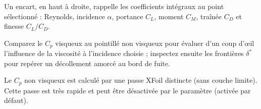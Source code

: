 Un encart, en haut à droite, rappelle les coefficients intégraux au
point sélectionné : Reynolds, incidence $\alpha$, portance $C_L$,
moment $C_M$, traînée $C_D$ et finesse $C_L/C_D$.

\begin{astuce}
Comparez le $C_p$ visqueux au pointillé non visqueux pour évaluer
d'un coup d'œil l'influence de la viscosité à l'incidence choisie ;
inspectez ensuite les frontières $\delta^*$ pour repérer un
décollement amorcé au bord de fuite.
\end{astuce}

\begin{noteinfo}
Le $C_p$ non visqueux est calculé par une passe XFoil distincte (sans
couche limite). Cette passe est très rapide et peut être désactivée
par le paramètre  (activée par défaut).
\end{noteinfo}
